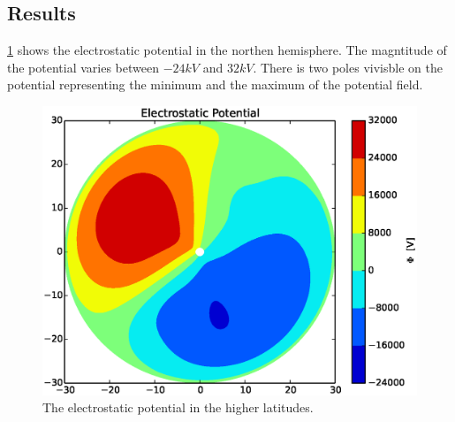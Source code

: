 \documentclass[x11names]{article}
\begin{document}
\subsection{Results}
  
  \cref{fig:potential} shows the electrostatic potential in the northen hemisphere. The magntitude of the potential varies between \(-24 \si{kV}\) and \(32 \si{kV}\). There is two poles vivisble on the potential representing the minimum and the maximum of the potential field.
  \begin{figure}
    \centering
    \includegraphics[scale = 0.5]{../source/other_proj}   
    \caption{The electrostatic potential in the higher latitudes.}
    \label{fig:potential}   
  \end{figure}


\appendix
\end{document}

